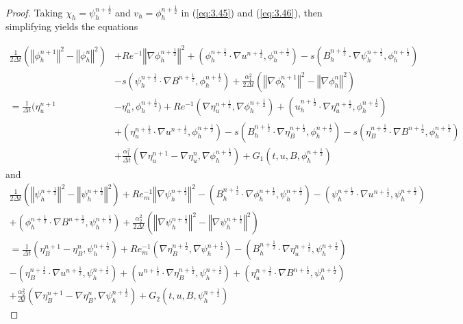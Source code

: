 \documentclass[11pt]{article}%
\numberwithin{equation}{section}
\newcommand{\norm}[1]{\left\Vert#1\right\Vert}
\def\grad{{\nabla}}
\def\nplushalf{{n+\frac12}}
\begin{document}
\begin{proof}
	Taking $\chi_{h} = \psi^{\nplushalf}_{h}$ and $v_{h} = \phi^{\nplushalf}_{h}$ in (\ref{eq:3.45}) and (\ref{eq:3.46}), then simplifying yields the equations
	
	\begin{equation}
	\begin{split}
	\frac{1}{2\Delta t}(\norm{\phi^{n+1}_{h}}^{2} - \norm{\phi^{n}_{h}}^{2}) & + Re^{-1}\norm{\nabla \phi^{\nplushalf}_{h}}^{2} + (\phi^{\nplushalf}_{h}\cdot\grad{u}^{\nplushalf},\phi^{\nplushalf}_{h}) 
	 - s(B^{\nplushalf}_{h}\cdot\grad{\psi^{\nplushalf}_{h}},\phi^{\nplushalf}_{h}) \\&- s(\psi^{\nplushalf}_{h}\cdot\grad{B}^{\nplushalf},\phi^{\nplushalf}_{h}) +\frac{\alpha_1^2}{2\Delta t}(\norm{\grad{\phi}^{n+1}_{h}}^{2} - \norm{\grad{\phi}^{n}_{h}}^{2}) \\
	= \frac{1}{\Delta t}(\eta^{n+1}_{u} & - \eta^{n}_{u},\phi^{\nplushalf}_{h}) + Re^{-1}(\grad{\eta}^{\nplushalf}_{u},\grad{\phi^{\nplushalf}_{h}}) + (u^{\nplushalf}_{h}\cdot\grad{\eta}^{\nplushalf}_{u},\phi^{\nplushalf}_{h}) \\
	& + (\eta^{\nplushalf}_{u}\cdot\grad{u}^{\nplushalf},\phi^{\nplushalf}_{h}) - s(B^{\nplushalf}_{h}\cdot \grad{\eta}^{\nplushalf}_{B},\phi^{\nplushalf}_{h}) - s(\eta^{\nplushalf}_{B}\cdot \grad{B}^{\nplushalf},\phi^{\nplushalf}_{h}) \\& + \frac{\alpha_1^2}{\Delta t}(\grad{\eta}^{n+1}_{u} - \grad{\eta}^{n}_{u},\grad{\phi}^{\nplushalf}_{h})+ G_{1}(t,u,B,\phi^{\nplushalf}_{h})
	\end{split}
	\label{eq:3.47}
	\end{equation}
	and 
	\begin{multline}
	\frac{1}{2\Delta t}\left(\norm{\psi^{\nplushalf}_{h}}^{2} - \norm{\psi^{\nplushalf}_{h}}^{2}\right)  + Re^{-1}_{m}\norm{\grad{\psi^{\nplushalf}_{h}}}^{2} - (B^{\nplushalf}_{h} \cdot \grad{\phi^{\nplushalf}_{h}},\psi^{\nplushalf}_{h}) - (\psi^{\nplushalf}_{h}\cdot\grad{u}^{\nplushalf},\psi^{\nplushalf}_{h}) \\
+ (\phi^{\nplushalf}_{h}\cdot \grad{B}^{\nplushalf},\psi^{\nplushalf}_{h}) + \frac{\alpha_2^2}{2\Delta t}\left(\norm{\grad{\psi}^{\nplushalf}_{h}}^{2} - \norm{\grad{\psi}^{\nplushalf}_{h}}^{2}\right)\\
= \frac{1}{\Delta t}(\eta^{n+1}_{B}  - \eta^{n}_{B},\psi^{\nplushalf}_{h})
	 + Re^{-1}_{m}(\grad{\eta}^{\nplushalf}_{B},\grad{\psi^{\nplushalf}_{h}}) - (B^{\nplushalf}_{h}\cdot\grad{\eta}^{\nplushalf}_{u},\psi^{\nplushalf}_{h}) \\
	- (\eta^{\nplushalf}_{B}\cdot\grad{u}^{\nplushalf},\psi^{\nplushalf}_{h}) + (u^{\nplushalf}\cdot\grad{\eta}^{\nplushalf}_{B},\psi^{\nplushalf}_{h})
	 + (\eta^{\nplushalf}_{u}\cdot\grad{B}^{\nplushalf},\psi^{\nplushalf}_{h}) \\
	+  \frac{\alpha_2^2}{\Delta t}(\grad{\eta}_B^{n+1}-\grad{\eta}_B^{n},\grad{\psi}_h^\nplushalf)+ G_{2}(t,u,B,\psi^{\nplushalf}_{h})
	\label{eq:3.48}
	\end{multline}
	

\end{proof}
\end{document}
